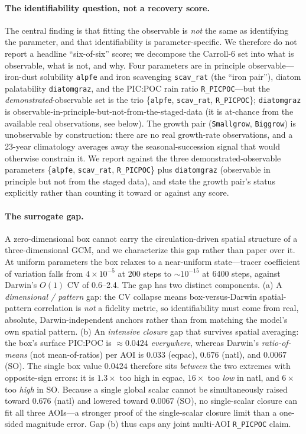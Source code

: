 \documentclass[11pt]{article}
\begin{document}
\paragraph{The identifiability question, not a recovery score.}
The central finding is that fitting the observable is \emph{not} the same as
identifying the parameter, and that identifiability is parameter-specific. We
therefore do not report a headline ``six-of-six'' score; we decompose the
Carroll-6 set into what is observable, what is not, and why. Four parameters are
in principle observable---iron-dust solubility \texttt{alpfe} and iron
scavenging \texttt{scav\_rat} (the ``iron pair''), diatom palatability
\texttt{diatomgraz}, and the PIC:POC rain ratio \texttt{R\_PICPOC}---but the
\emph{demonstrated}-observable set is the trio \{\texttt{alpfe},
\texttt{scav\_rat}, \texttt{R\_PICPOC}\}; \texttt{diatomgraz} is
observable-in-principle-but-not-from-the-staged-data (it is at-chance from the
available real observations, see below). The growth
pair (\texttt{Smallgrow}, \texttt{Biggrow}) is unobservable by construction:
there are no real growth-rate observations, and a 23-year climatology averages
away the seasonal-succession signal that would otherwise constrain it. We
report against the three demonstrated-observable parameters
\{\texttt{alpfe}, \texttt{scav\_rat}, \texttt{R\_PICPOC}\} plus
\texttt{diatomgraz} (observable in principle but not from the staged data), and
state the growth pair's status explicitly rather than counting it toward or
against any score.

\paragraph{The surrogate gap.}
A zero-dimensional box cannot carry the circulation-driven spatial structure of
a three-dimensional GCM, and we characterize this gap rather than paper over it.
At uniform parameters the box relaxes to a near-uniform state---tracer
coefficient of variation falls from $4\times10^{-5}$ at 200 steps to
$\sim10^{-15}$ at 6400 steps, against Darwin's $O(1)$ CV of 0.6--2.4. The gap has
two distinct components. (a) A \emph{dimensional / pattern} gap: the CV collapse
means box-versus-Darwin spatial-pattern correlation is \emph{not} a fidelity
metric, so identifiability must come from real, absolute, Darwin-independent
anchors rather than from matching the model's own spatial pattern. (b) An
\emph{intensive closure} gap that survives spatial averaging: the box's surface
PIC:POC is $\approx0.0424$ \emph{everywhere}, whereas Darwin's
\emph{ratio-of-means} (not mean-of-ratios) per AOI is $0.033$ (eqpac), $0.676$
(natl), and $0.0067$ (SO). The single box value $0.0424$ therefore sits
\emph{between} the two extremes with opposite-sign errors: it is $1.3\times$ too
high in eqpac, $16\times$ too \emph{low} in natl, and $6\times$ too \emph{high}
in SO. Because a single global scalar cannot be simultaneously raised toward
$0.676$ (natl) and lowered toward $0.0067$ (SO), no single-scalar closure can fit
all three AOIs---a stronger proof of the single-scalar closure limit than a
one-sided magnitude error. Gap (b) thus caps any joint multi-AOI
\texttt{R\_PICPOC} claim.
\end{document}
